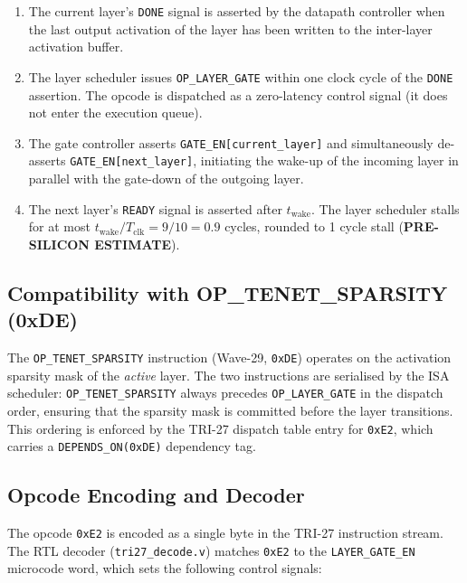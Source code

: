 \begin{enumerate}
  \item The current layer's \texttt{DONE} signal is asserted by the
    datapath controller when the last output activation of the layer
    has been written to the inter-layer activation buffer.

  \item The layer scheduler issues \texttt{OP\_LAYER\_GATE} within one
    clock cycle of the \texttt{DONE} assertion.  The opcode is dispatched
    as a zero-latency control signal (it does not enter the execution queue).

  \item The gate controller asserts \texttt{GATE\_EN[current\_layer]}
    and simultaneously de-asserts \texttt{GATE\_EN[next\_layer]}, initiating
    the wake-up of the incoming layer in parallel with the gate-down of the
    outgoing layer.

  \item The next layer's \texttt{READY} signal is asserted after
    \(t_{\mathrm{wake}}\).  The layer scheduler stalls for at most
    \(t_{\mathrm{wake}} / T_{\mathrm{clk}} = 9 / 10 = 0.9\) cycles, rounded
    to 1 cycle stall (\textbf{PRE-SILICON ESTIMATE}).
\end{enumerate}

\subsection{Compatibility with OP\_TENET\_SPARSITY (0xDE)}

The \texttt{OP\_TENET\_SPARSITY} instruction (Wave-29, \texttt{0xDE})
operates on the activation sparsity mask of the \emph{active} layer.
The two instructions are serialised by the ISA scheduler: \texttt{OP\_TENET\_SPARSITY}
always precedes \texttt{OP\_LAYER\_GATE} in the dispatch order, ensuring
that the sparsity mask is committed before the layer transitions.  This
ordering is enforced by the TRI-27 dispatch table entry for
\texttt{0xE2}, which carries a \texttt{DEPENDS\_ON(0xDE)} dependency tag.

\subsection{Opcode Encoding and Decoder}

The opcode \texttt{0xE2} is encoded as a single byte in the TRI-27
instruction stream.  The RTL decoder (\texttt{tri27\_decode.v}) matches
\texttt{0xE2} to the \texttt{LAYER\_GATE\_EN} microcode word, which sets
the following control signals:

